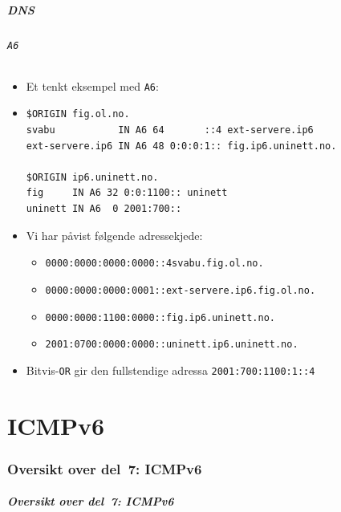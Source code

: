 \begin{frame}[fragile]%
  \frametitle{DNS}
  \framesubtitle{\texttt{A6}}
  \begin{itemize}%
  \item Et tenkt eksempel med \texttt{A6}:
  \item 
\begin{verbatim}
$ORIGIN fig.ol.no.
svabu           IN A6 64       ::4 ext-servere.ip6
ext-servere.ip6 IN A6 48 0:0:0:1:: fig.ip6.uninett.no.

$ORIGIN ip6.uninett.no.
fig     IN A6 32 0:0:1100:: uninett
uninett IN A6  0 2001:700::
\end{verbatim}
    \item Vi har påvist følgende adressekjede:
      \begin{itemize}%
      \item \texttt{0000:0000:0000:0000::4}\hfill\texttt{svabu.fig.ol.no.}
      \item \texttt{0000:0000:0000:0001::}\hfill\texttt{ext-servere.ip6.fig.ol.no.}
      \item \texttt{0000:0000:1100:0000::}\hfill\texttt{fig.ip6.uninett.no.}
      \item \texttt{2001:0700:0000:0000::}\hfill\texttt{uninett.ip6.uninett.no.}
      \end{itemize}
    \item Bitvis-\texttt{OR} gir den fullstendige adressa \texttt{2001:700:1100:1::4}
  \end{itemize}
\end{frame}

\part{ICMPv6}

\begin{frame}
  \partpage
\end{frame}

\section*{Oversikt over del~7: ICMPv6}
\begin{frame}[allowframebreaks]
  \frametitle{Oversikt over del~7: ICMPv6}
    \tableofcontents%
\end{frame}

